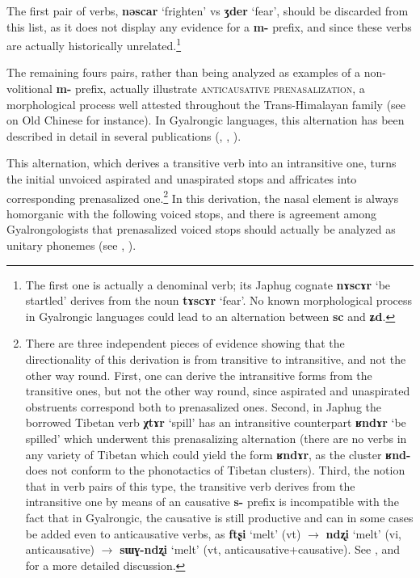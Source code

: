 \documentclass[oneside,a4paper,11pt]{article}
\newcommand{\ipa}[1]{\textbf{{\phon\mbox{#1}}}} %
\begin{document}
 The first pair of verbs, \ipa{nəscar} `frighten' vs \ipa{ʒder} `fear', should be discarded from this list, as it does not display any evidence for a \ipa{m-} prefix, and since these verbs are actually historically unrelated.\footnote{The first one is actually a denominal verb; its Japhug cognate \ipa{nɤscɤr} `be startled' derives from the noun \ipa{tɤscɤr} `fear'. No known morphological process in Gyalrongic languages could lead to an alternation between \ipa{sc} and \ipa{ʑd}.}

The remaining fours pairs, rather than being analyzed as examples of a non-volitional \ipa{m-} prefix, actually illustrate \textsc{anticausative prenasalization}, a morphological process well attested throughout the Trans-Himalayan family (see \citealt{sagart03prenasalized} on Old Chinese for instance). In Gyalrongic languages, this alternation has been described in detail in several publications (\citealt{lai13affixale}, \citealt{jacques15spontaneous}, \citealt{jacques15causative}). 

This alternation, which derives a transitive verb into an intransitive one, turns the initial unvoiced aspirated and unaspirated stops and affricates into corresponding prenasalized one.\footnote{There are three independent pieces of evidence showing that the directionality of this derivation is from transitive to intransitive, and not the other way round. First, one can derive the intransitive forms from the transitive ones, but not the other way round, since aspirated and unaspirated obstruents correspond both to prenasalized ones. Second, in Japhug the borrowed Tibetan verb \ipa{χtɤr} `spill' has an intransitive counterpart \ipa{ʁndɤr} `be spilled' which underwent this prenasalizing alternation (there are no verbs in any variety of Tibetan which could yield the form \ipa{ʁndɤr}, as the cluster \ipa{ʁnd-} does not conform to the phonotactics of Tibetan clusters). Third, the notion that in verb pairs of this type, the transitive verb derives from the intransitive one by means of an causative \ipa{s-} prefix is incompatible with the fact that in Gyalrongic, the causative is still productive and can in some cases be added even to anticausative verbs, as \ipa{ftʂi} `melt' (vt) $\rightarrow$ \ipa{ndʐi} `melt' (vi, anticausative) $\rightarrow$ \ipa{sɯɣ-ndʐi} `melt' (vt, anticausative+causative). See \citet{jacques15spontaneous}, \citet{jacques15causative} and \citet{gong17xingtaixue} for a more detailed discussion. } In this derivation, the nasal element is always homorganic with the following voiced stops, and there is agreement among Gyalrongologists that prenasalized voiced stops should actually be analyzed as unitary phonemes (see \citealt{jackson03caodeng}, \citealt[8-9]{jacques08}).
\end{document}
